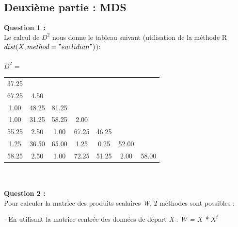 \documentclass[a4paper, 10pt]{article}
\begin{document}
\subsection*{Deuxième partie : MDS}
\textbf{Question 1 :}\\
Le calcul de \textit{$D^{2}$} nous donne le tableau suivant (utilisation de la méthode R $dist(X, method = "euclidian")$):\\ \\
$D^{2}$ = 
\begin{tabular}{|ccccccc|}
37.25 & & & & & & \\
67.25 & 4.50 & & & & & \\
1.00 & 48.25 & 81.25 & & & & \\
1.00 & 31.25 & 58.25 & 2.00 & & & \\
55.25 & 2.50 & 1.00 & 67.25 & 46.25 & & \\
1.25 & 36.50 & 65.00 & 1.25 & 0.25 & 52.00 & \\
58.25 & 2.50 & 1.00 & 72.25 & 51.25 & 2.00 & 58.00 \\
\end{tabular}\\ \\
\textbf{Question 2 :}\\
Pour calculer la matrice des produits scalaires \textit{W}, 2 méthodes sont possibles :

- En utilisant la matrice centrée des données de départ \textit{X} : \textit{W = X * $X^{t}$}
\end{document}

